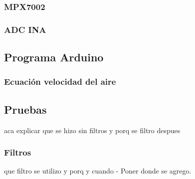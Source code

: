 	\subsubsection{MPX7002}
    \subsubsection{ADC INA}

    \subsection{Programa Arduino}
        \subsubsection{Ecuación velocidad del aire}
    
    \subsection{Pruebas}
    aca explicar que se hizo sin filtros y porq se filtro despues
        \subsubsection{Filtros}
        que filtro se utilizo y porq y cuando
    - Poner donde se agrego.

\newpage